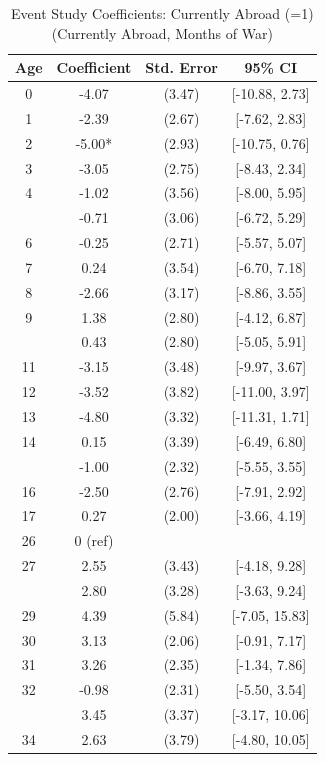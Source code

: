 \begin{table}[!h]
\centering
\caption{\label{tab:event_study_8b_currently_abroad_months}Event Study Coefficients: Currently Abroad (=1) (Currently Abroad, Months of War)}
\centering
\fontsize{9}{11}\selectfont
\begin{threeparttable}
\begin{tabular}[t]{cccc}
\toprule
Age & Coefficient & Std. Error & 95\% CI\\
\midrule
0 & -4.07 & (3.47) & {}[-10.88, 2.73]\\
1 & -2.39 & (2.67) & {}[-7.62, 2.83]\\
2 & -5.00* & (2.93) & {}[-10.75, 0.76]\\
3 & -3.05 & (2.75) & {}[-8.43, 2.34]\\
4 & -1.02 & (3.56) & {}[-8.00, 5.95]\\
\addlinespace
5 & -0.71 & (3.06) & {}[-6.72, 5.29]\\
6 & -0.25 & (2.71) & {}[-5.57, 5.07]\\
7 & 0.24 & (3.54) & {}[-6.70, 7.18]\\
8 & -2.66 & (3.17) & {}[-8.86, 3.55]\\
9 & 1.38 & (2.80) & {}[-4.12, 6.87]\\
\addlinespace
10 & 0.43 & (2.80) & {}[-5.05, 5.91]\\
11 & -3.15 & (3.48) & {}[-9.97, 3.67]\\
12 & -3.52 & (3.82) & {}[-11.00, 3.97]\\
13 & -4.80 & (3.32) & {}[-11.31, 1.71]\\
14 & 0.15 & (3.39) & {}[-6.49, 6.80]\\
\addlinespace
15 & -1.00 & (2.32) & {}[-5.55, 3.55]\\
16 & -2.50 & (2.76) & {}[-7.91, 2.92]\\
17 & 0.27 & (2.00) & {}[-3.66, 4.19]\\
26 & 0 (ref) &  & \\
27 & 2.55 & (3.43) & {}[-4.18, 9.28]\\
\addlinespace
28 & 2.80 & (3.28) & {}[-3.63, 9.24]\\
29 & 4.39 & (5.84) & {}[-7.05, 15.83]\\
30 & 3.13 & (2.06) & {}[-0.91, 7.17]\\
31 & 3.26 & (2.35) & {}[-1.34, 7.86]\\
32 & -0.98 & (2.31) & {}[-5.50, 3.54]\\
\addlinespace
33 & 3.45 & (3.37) & {}[-3.17, 10.06]\\
34 & 2.63 & (3.79) & {}[-4.80, 10.05]\\

\end{tabular}
\end{threeparttable}
\end{table}
